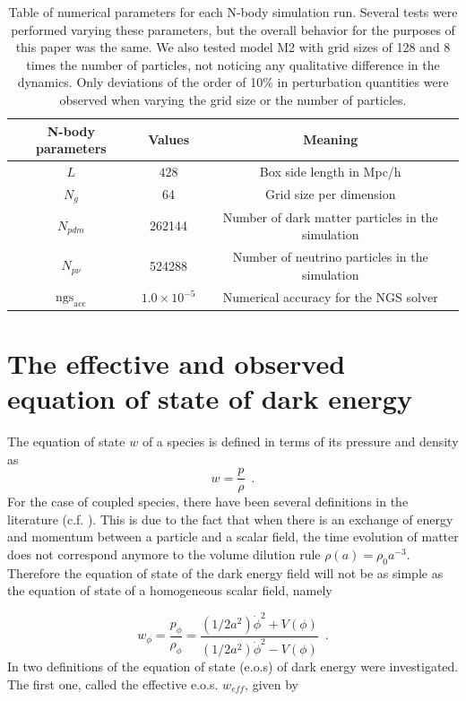 \begin{table}[H]
\tiny
\centering{}%
\begin{tabular}{|c|c|c|}
\hline 
N-body parameters  & Values  & Meaning\tabularnewline
\hline 
\hline 
$L$  & $428$  & Box side length in Mpc/h\tabularnewline
\hline 
$N_{g}$  & 64  & Grid size per dimension\tabularnewline
\hline 
$N_{pdm}$  & 262144  & Number of dark matter particles in the simulation\tabularnewline
\hline 
$N_{p\nu}$  & 524288  & Number of neutrino particles in the simulation\tabularnewline
\hline 
$\mbox{ngs}_{\mbox{acc}}$  & $1.0\times10^{-5}$  & Numerical accuracy for the NGS solver\tabularnewline
\hline 
\end{tabular}
\small
\protect\protect\protect\caption[Table of numerical parameters for each
N-body simulation run in GNQ.]{\label{tab:Nbody-inipars-1-1} Table of numerical parameters for each
N-body simulation run. Several tests were performed varying these
parameters, but the overall behavior for the purposes of this paper
was the same. We also tested model M2 with grid sizes of 128 and 8
times the number of particles, not noticing any qualitative difference
in the dynamics. Only deviations of the order of 10\% in perturbation
quantities were observed when varying the grid size or the number
of particles.}
\end{table}
\normalsize


\section{The effective and observed equation of state of dark energy\label{sec:The-effective-W}}

The equation of state $w$ of a species is defined in terms of its
pressure and density as 
\begin{equation}
w=\frac{p}{\rho}\,\,\,.
\end{equation}
For the case of coupled species, there have been several definitions
in the literature (c.f. \cite{brookfield_cosmology_2007,das_super-acceleration_2006,perrotta_extended_1999,perrotta_dark_2002}).
This is due to the fact that when there is an exchange of energy and
momentum between a particle and a scalar field, the time evolution
of matter does not correspond anymore to the volume dilution rule
$\rho(a)=\rho_{0}a^{-3}$. Therefore the equation of state of the
dark energy field will not be as simple as the equation of state of
a homogeneous scalar field, namely

\begin{equation}
w_{\phi}=\frac{p_{\phi}}{\rho_{\phi}}=\frac{(1/2a^{2})\dot{\phi}^{2}+V(\phi)}{(1/2a^{2})\dot{\phi}^{2}-V(\phi)}\,\,\,.
\end{equation}
In \cite{das_super-acceleration_2006,brookfield_cosmology_2007} two
definitions of the equation of state (e.o.s) of dark energy were investigated.
The first one, called the effective e.o.s. $w_{eff}$, given by


